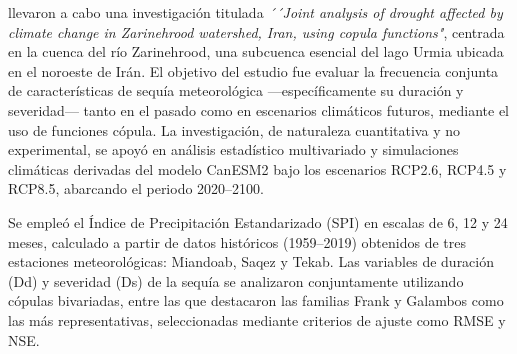 \begin{center}
    \end{center}
    

\textcite{Samadian2024} llevaron a cabo una investigación titulada \textit{´´Joint analysis of drought affected by climate change in Zarinehrood watershed, Iran, using copula functions"}, centrada en la cuenca del río Zarinehrood, una subcuenca esencial del lago Urmia ubicada en el noroeste de Irán. El objetivo del estudio fue evaluar la frecuencia conjunta de características de sequía meteorológica —específicamente su duración y severidad— tanto en el pasado como en escenarios climáticos futuros, mediante el uso de funciones cópula. La investigación, de naturaleza cuantitativa y no experimental, se apoyó en análisis estadístico multivariado y simulaciones climáticas derivadas del modelo CanESM2 bajo los escenarios RCP2.6, RCP4.5 y RCP8.5, abarcando el periodo 2020–2100.

Se empleó el Índice de Precipitación Estandarizado (SPI) en escalas de 6, 12 y 24 meses, calculado a partir de datos históricos (1959–2019) obtenidos de tres estaciones meteorológicas: Miandoab, Saqez y Tekab. Las variables de duración (Dd) y severidad (Ds) de la sequía se analizaron conjuntamente utilizando cópulas bivariadas, entre las que destacaron las familias Frank y Galambos como las más representativas, seleccionadas mediante criterios de ajuste como RMSE y NSE.

